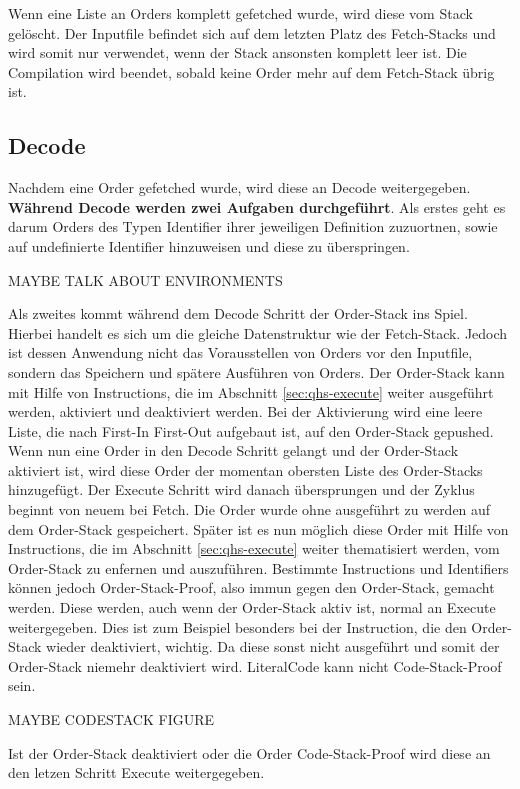 Wenn eine Liste an Orders komplett gefetched wurde, wird diese vom Stack gelöscht. Der Inputfile befindet sich auf dem letzten Platz des Fetch-Stacks und wird somit nur verwendet, wenn der Stack ansonsten komplett leer ist.
Die Compilation wird beendet, sobald keine Order mehr auf dem Fetch-Stack übrig ist.

\subsection{Decode} \label{sec:qhs-decode}
Nachdem eine Order gefetched wurde, wird diese an Decode weitergegeben. \textbf{Während Decode werden zwei Aufgaben durchgeführt}.
Als erstes geht es darum Orders des Typen Identifier ihrer jeweiligen Definition zuzuortnen, sowie auf undefinierte Identifier hinzuweisen und diese zu überspringen.

MAYBE TALK ABOUT ENVIRONMENTS

Als zweites kommt während dem Decode Schritt der Order-Stack ins Spiel. Hierbei handelt es sich um die gleiche Datenstruktur wie der Fetch-Stack. Jedoch ist dessen Anwendung nicht das Vorausstellen von Orders vor den Inputfile,
sondern das Speichern und spätere Ausführen von Orders. Der Order-Stack kann mit Hilfe von Instructions, die im Abschnitt \ref{sec:qhs-execute} weiter ausgeführt werden, aktiviert und deaktiviert werden.
Bei der Aktivierung wird eine leere Liste, die nach First-In First-Out aufgebaut ist, auf den Order-Stack gepushed. Wenn nun eine Order in den Decode Schritt gelangt und der Order-Stack aktiviert ist,
wird diese Order der momentan obersten Liste des Order-Stacks hinzugefügt. Der Execute Schritt wird danach übersprungen und der Zyklus beginnt von neuem bei Fetch. Die Order wurde ohne ausgeführt zu werden auf dem Order-Stack gespeichert.
Später ist es nun möglich diese Order mit Hilfe von Instructions, die im Abschnitt \ref{sec:qhs-execute} weiter thematisiert werden, vom Order-Stack zu enfernen und auszuführen.
Bestimmte Instructions und Identifiers können jedoch Order-Stack-Proof, also immun gegen den Order-Stack, gemacht werden. Diese werden, auch wenn der Order-Stack aktiv ist, normal an Execute weitergegeben.
Dies ist zum Beispiel besonders bei der Instruction, die den Order-Stack wieder deaktiviert, wichtig. Da diese sonst nicht ausgeführt und somit der Order-Stack niemehr deaktiviert wird.
LiteralCode kann nicht Code-Stack-Proof sein.

MAYBE CODESTACK FIGURE

Ist der Order-Stack deaktiviert oder die Order Code-Stack-Proof wird diese an den letzen Schritt Execute weitergegeben.

